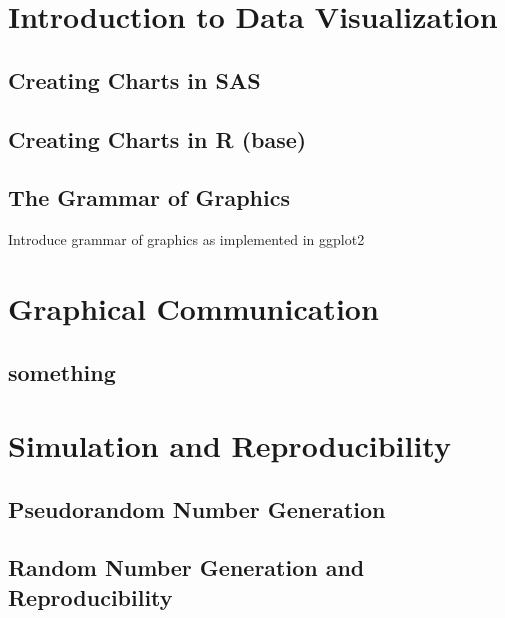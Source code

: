 \documentclass[]{book}
\begin{document}
\hypertarget{data-vis-intro}{%
\chapter{Introduction to Data Visualization}\label{data-vis-intro}}

\hypertarget{creating-charts-in-sas}{%
\section{Creating Charts in SAS}\label{creating-charts-in-sas}}

\hypertarget{creating-charts-in-r-base}{%
\section{Creating Charts in R (base)}\label{creating-charts-in-r-base}}

\hypertarget{the-grammar-of-graphics}{%
\section{The Grammar of Graphics}\label{the-grammar-of-graphics}}

Introduce grammar of graphics as implemented in ggplot2

\hypertarget{graphical-communication}{%
\chapter{Graphical Communication}\label{graphical-communication}}

\hypertarget{something}{%
\section{something}\label{something}}

\hypertarget{simulation}{%
\chapter{Simulation and Reproducibility}\label{simulation}}

\hypertarget{pseudorandom-number-generation}{%
\section{Pseudorandom Number Generation}\label{pseudorandom-number-generation}}

\hypertarget{random-number-generation-and-reproducibility}{%
\section{Random Number Generation and Reproducibility}\label{random-number-generation-and-reproducibility}}
\end{document}
